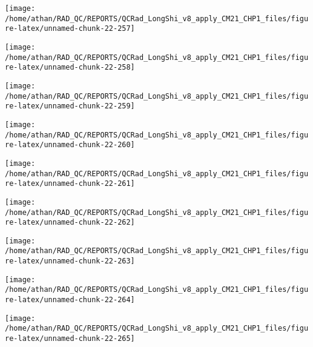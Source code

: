 \documentclass[
  10pt,
  a4paper,oneside]{article}
\begin{document}
\begin{center}\texttt{[image: /home/athan/RAD\_QC/REPORTS/QCRad\_LongShi\_v8\_apply\_CM21\_CHP1\_files/figure-latex/unnamed-chunk-22-257]} \end{center}

\begin{center}\texttt{[image: /home/athan/RAD\_QC/REPORTS/QCRad\_LongShi\_v8\_apply\_CM21\_CHP1\_files/figure-latex/unnamed-chunk-22-258]} \end{center}

\begin{center}\texttt{[image: /home/athan/RAD\_QC/REPORTS/QCRad\_LongShi\_v8\_apply\_CM21\_CHP1\_files/figure-latex/unnamed-chunk-22-259]} \end{center}

\begin{center}\texttt{[image: /home/athan/RAD\_QC/REPORTS/QCRad\_LongShi\_v8\_apply\_CM21\_CHP1\_files/figure-latex/unnamed-chunk-22-260]} \end{center}

\begin{center}\texttt{[image: /home/athan/RAD\_QC/REPORTS/QCRad\_LongShi\_v8\_apply\_CM21\_CHP1\_files/figure-latex/unnamed-chunk-22-261]} \end{center}

\begin{center}\texttt{[image: /home/athan/RAD\_QC/REPORTS/QCRad\_LongShi\_v8\_apply\_CM21\_CHP1\_files/figure-latex/unnamed-chunk-22-262]} \end{center}

\begin{center}\texttt{[image: /home/athan/RAD\_QC/REPORTS/QCRad\_LongShi\_v8\_apply\_CM21\_CHP1\_files/figure-latex/unnamed-chunk-22-263]} \end{center}

\begin{center}\texttt{[image: /home/athan/RAD\_QC/REPORTS/QCRad\_LongShi\_v8\_apply\_CM21\_CHP1\_files/figure-latex/unnamed-chunk-22-264]} \end{center}

\begin{center}\texttt{[image: /home/athan/RAD\_QC/REPORTS/QCRad\_LongShi\_v8\_apply\_CM21\_CHP1\_files/figure-latex/unnamed-chunk-22-265]} \end{center}
\end{document}
